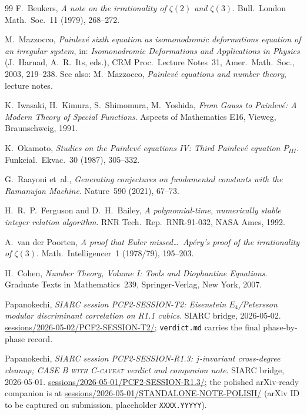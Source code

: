 \documentclass[11pt,a4paper]{article}
\theoremstyle{definition}
\theoremstyle{remark}
\begin{document}
\begin{thebibliography}{99}
F.~Beukers, \emph{A note on the irrationality of $\zeta(2)$ and
$\zeta(3)$}. Bull.~London Math.~Soc.~11 (1979), 268--272.

M.~Mazzocco, \emph{Painlev\'e sixth equation as isomonodromic deformations
equation of an irregular system}, in: \emph{Isomonodromic Deformations and
Applications in Physics} (J.~Harnad, A.~R.~Its, eds.),
CRM Proc.~Lecture Notes~31, Amer.~Math.~Soc., 2003, 219--238.
See also: M.~Mazzocco, \emph{Painlev\'e equations and number theory},
lecture notes.

K.~Iwasaki, H.~Kimura, S.~Shimomura, M.~Yoshida,
\emph{From Gauss to Painlev\'e: A Modern Theory of Special Functions}.
Aspects of Mathematics E16, Vieweg, Braunschweig, 1991.

K.~Okamoto, \emph{Studies on the Painlev\'e equations IV: Third
Painlev\'e equation $P_{III}$}. Funkcial.~Ekvac.~30 (1987), 305--332.

G.~Raayoni et~al., \emph{Generating conjectures on fundamental constants
with the Ramanujan Machine}.
Nature~590 (2021), 67--73.

H.~R.~P.~Ferguson and D.~H.~Bailey, \emph{A polynomial-time, numerically
stable integer relation algorithm}. RNR Tech.\ Rep.\ RNR-91-032, NASA
Ames, 1992.

A.~van der Poorten, \emph{A proof that Euler missed\ldots\ Ap\'ery's proof
of the irrationality of $\zeta(3)$}. Math.~Intelligencer~1 (1978/79),
195--203.

H.~Cohen, \emph{Number Theory, Volume I: Tools and Diophantine
Equations}. Graduate Texts in Mathematics~239, Springer-Verlag, New
York, 2007.

Papanokechi, \emph{SIARC session PCF2-SESSION-T2: Eisenstein
$E_4$/Petersson modular discriminant correlation on R1.1 cubics}.
SIARC bridge, 2026-05-02.
\href{https://github.com/papanokechi/siarc-relay-bridge/tree/main/sessions/2026-05-02/PCF2-SESSION-T2/}
{sessions/2026-05-02/PCF2-SESSION-T2/}; \texttt{verdict.md} carries
the final phase-by-phase record.

Papanokechi, \emph{SIARC session PCF2-SESSION-R1.3: $j$-invariant
cross-degree cleanup; \textsc{CASE B with C-caveat} verdict and
companion note}. SIARC bridge, 2026-05-01.
\href{https://github.com/papanokechi/siarc-relay-bridge/tree/main/sessions/2026-05-01/PCF2-SESSION-R1.3/}
{sessions/2026-05-01/PCF2-SESSION-R1.3/}; the polished arXiv-ready
companion is at
\href{https://github.com/papanokechi/siarc-relay-bridge/tree/main/sessions/2026-05-01/STANDALONE-NOTE-POLISH/}
{sessions/2026-05-01/STANDALONE-NOTE-POLISH/} (arXiv ID to be
captured on submission, placeholder \texttt{XXXX.YYYYY}).


\end{thebibliography}
\end{document}

